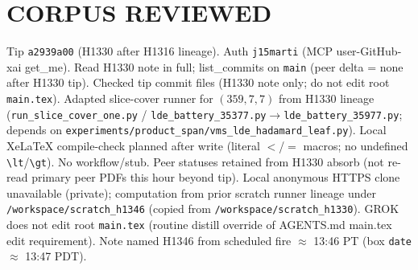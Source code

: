 \documentclass[11pt]{article}
\begin{document}
\section*{CORPUS REVIEWED}
Tip \texttt{a2939a00} (H1330 after H1316 lineage). Auth \texttt{j15marti} (MCP user-GitHub-xai get\_me).
Read H1330 note in full; list\_commits on \texttt{main} (peer delta = none after H1330 tip).
Checked tip commit files (H1330 note only; do not edit root \texttt{main.tex}).
Adapted slice-cover runner for $(359,7,7)$ from H1330 lineage
(\texttt{run\_slice\_cover\_one.py} / \texttt{lde\_battery\_35377.py}$\to$\texttt{lde\_battery\_35977.py};
depends on \texttt{experiments/product\_span/vms\_lde\_hadamard\_leaf.py}).
Local XeLaTeX compile-check planned after write (literal $<$/$=$ macros; no undefined \texttt{\textbackslash lt}/\texttt{\textbackslash gt}).
No workflow/stub. Peer statuses retained from H1330 absorb (not re-read primary peer PDFs this hour beyond tip).
Local anonymous HTTPS clone unavailable (private);
computation from prior scratch runner lineage under \texttt{/workspace/scratch\_h1346}
(copied from \texttt{/workspace/scratch\_h1330}).
GROK does not edit root \texttt{main.tex} (routine distill override of AGENTS.md main.tex edit requirement).
Note named H1346 from scheduled fire $\approx$ 13:46 PT (box \texttt{date} $\approx$ 13:47 PDT).
\end{document}
